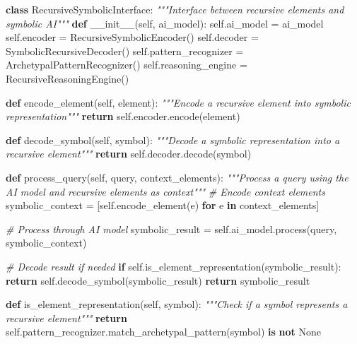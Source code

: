 \documentclass[
]{article}
\newenvironment{Shaded}{}{}
\newcommand{\CommentTok}[1]{\textcolor[rgb]{0.38,0.63,0.69}{\textit{#1}}}
\newcommand{\ControlFlowTok}[1]{\textcolor[rgb]{0.00,0.44,0.13}{\textbf{#1}}}
\newcommand{\FunctionTok}[1]{\textcolor[rgb]{0.02,0.16,0.49}{#1}}
\newcommand{\KeywordTok}[1]{\textcolor[rgb]{0.00,0.44,0.13}{\textbf{#1}}}
\newcommand{\NormalTok}[1]{#1}
\newcommand{\OperatorTok}[1]{\textcolor[rgb]{0.40,0.40,0.40}{#1}}
\newcommand{\VariableTok}[1]{\textcolor[rgb]{0.10,0.09,0.49}{#1}}
\begin{document}
\begin{Shaded}
\begin{Highlighting}[]
\KeywordTok{class}\NormalTok{ RecursiveSymbolicInterface:}
    \CommentTok{"""Interface between recursive elements and symbolic AI"""}
    \KeywordTok{def} \FunctionTok{\_\_init\_\_}\NormalTok{(}\VariableTok{self}\NormalTok{, ai\_model):}
        \VariableTok{self}\NormalTok{.ai\_model }\OperatorTok{=}\NormalTok{ ai\_model}
        \VariableTok{self}\NormalTok{.encoder }\OperatorTok{=}\NormalTok{ RecursiveSymbolicEncoder()}
        \VariableTok{self}\NormalTok{.decoder }\OperatorTok{=}\NormalTok{ SymbolicRecursiveDecoder()}
        \VariableTok{self}\NormalTok{.pattern\_recognizer }\OperatorTok{=}\NormalTok{ ArchetypalPatternRecognizer()}
        \VariableTok{self}\NormalTok{.reasoning\_engine }\OperatorTok{=}\NormalTok{ RecursiveReasoningEngine()}

    \KeywordTok{def}\NormalTok{ encode\_element(}\VariableTok{self}\NormalTok{, element):}
        \CommentTok{"""Encode a recursive element into symbolic representation"""}
        \ControlFlowTok{return} \VariableTok{self}\NormalTok{.encoder.encode(element)}

    \KeywordTok{def}\NormalTok{ decode\_symbol(}\VariableTok{self}\NormalTok{, symbol):}
        \CommentTok{"""Decode a symbolic representation into a recursive element"""}
        \ControlFlowTok{return} \VariableTok{self}\NormalTok{.decoder.decode(symbol)}

    \KeywordTok{def}\NormalTok{ process\_query(}\VariableTok{self}\NormalTok{, query, context\_elements):}
        \CommentTok{"""Process a query using the AI model and recursive elements as context"""}
        \CommentTok{\# Encode context elements}
\NormalTok{        symbolic\_context }\OperatorTok{=}\NormalTok{ [}\VariableTok{self}\NormalTok{.encode\_element(e) }\ControlFlowTok{for}\NormalTok{ e }\KeywordTok{in}\NormalTok{ context\_elements]}

        \CommentTok{\# Process through AI model}
\NormalTok{        symbolic\_result }\OperatorTok{=} \VariableTok{self}\NormalTok{.ai\_model.process(query, symbolic\_context)}

        \CommentTok{\# Decode result if needed}
        \ControlFlowTok{if} \VariableTok{self}\NormalTok{.is\_element\_representation(symbolic\_result):}
            \ControlFlowTok{return} \VariableTok{self}\NormalTok{.decode\_symbol(symbolic\_result)}
        \ControlFlowTok{return}\NormalTok{ symbolic\_result}

    \KeywordTok{def}\NormalTok{ is\_element\_representation(}\VariableTok{self}\NormalTok{, symbol):}
        \CommentTok{"""Check if a symbol represents a recursive element"""}
        \ControlFlowTok{return} \VariableTok{self}\NormalTok{.pattern\_recognizer.match\_archetypal\_pattern(symbol) }\KeywordTok{is} \KeywordTok{not} \VariableTok{None}
\end{Highlighting}
\end{Shaded}
\end{document}
